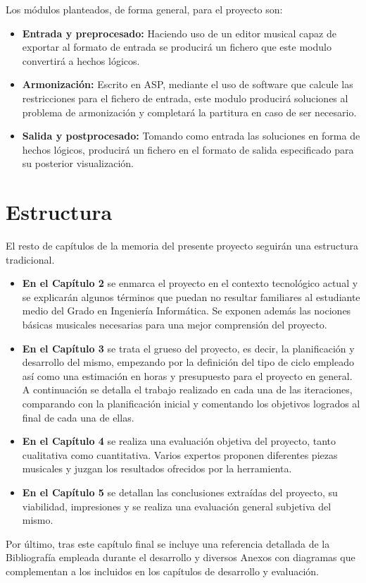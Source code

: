  Los módulos planteados, de forma general, para el proyecto son:
 \begin{itemize}
 	\item \textbf{Entrada y preprocesado:} Haciendo uso de un editor musical capaz de exportar al formato de entrada se producirá un fichero que este modulo convertirá a hechos lógicos.
 	\item \textbf{Armonización:} Escrito en ASP, mediante el uso de software que calcule las restricciones para el fichero de entrada, este modulo producirá soluciones al problema de armonización y completará la partitura en caso de ser necesario.
 	\item \textbf{Salida y postprocesado:} Tomando como entrada las soluciones en forma de hechos lógicos, producirá un fichero en el formato de salida especificado para su posterior visualización.
 \end{itemize}
 
 
 \section{Estructura}
 
 El resto de capítulos de la memoria del presente proyecto seguirán una estructura tradicional. 
 \begin{itemize}
 	\item \textbf{En el Capítulo 2} se enmarca el proyecto en el contexto tecnológico actual y se explicarán algunos términos que puedan no resultar familiares al estudiante medio del Grado en Ingeniería Informática. Se exponen además las nociones básicas musicales necesarias para una mejor comprensión del proyecto.
 	\item \textbf{En el Capítulo 3} se trata el grueso del proyecto, es decir, la planificación y desarrollo del mismo, empezando por la definición del tipo de ciclo empleado así como una estimación en horas y presupuesto para el proyecto en general. A continuación se detalla el trabajo realizado en cada una de las iteraciones, comparando con la planificación inicial y comentando los objetivos logrados al final de cada una de ellas.
  	\item \textbf{En el Capítulo 4} se realiza una evaluación objetiva del proyecto, tanto cualitativa como cuantitativa. Varios expertos proponen diferentes piezas musicales y juzgan los resultados ofrecidos por la herramienta.
 	\item \textbf{En el Capítulo 5} se detallan las conclusiones extraídas del proyecto, su viabilidad, impresiones y se realiza una evaluación general subjetiva del mismo.
 	
 \end{itemize}
 Por último, tras este capítulo final se incluye una referencia detallada de la Bibliografía empleada durante el desarrollo y diversos Anexos con diagramas que complementan a los incluidos en los capítulos de desarrollo y evaluación.
 
